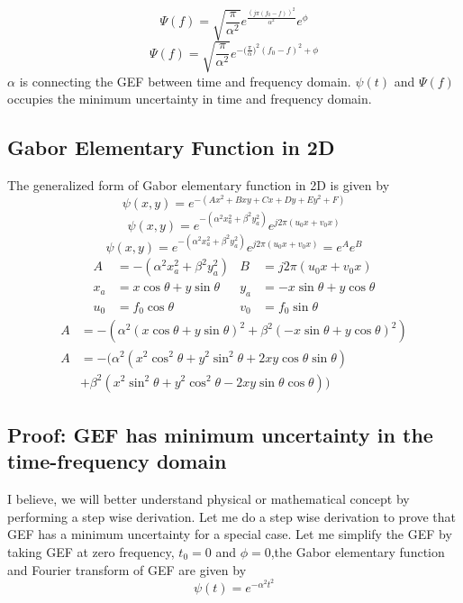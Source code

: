 \documentclass[paper=a4, fontsize=11pt,twoside]{scrartcl}		%
\begin{document}
\begin{equation*}
\Psi(f) = \sqrt{\frac{\pi}{\alpha ^2}} e^\frac{{(j\pi (f_0-f))}^2}{\alpha ^2}e^\phi
\end{equation*}
\begin{equation*}
\Psi(f) = \sqrt{\frac{\pi}{\alpha ^2}} e^{-{(\frac{\pi} {\alpha}})^2 ({f_0-f})^2+\phi}
\end{equation*}
$\alpha$ is connecting the GEF between time and frequency domain. $\psi(t)$ and $\Psi(f)$ occupies the minimum uncertainty in time and frequency domain.

\subsection {Gabor Elementary Function in 2D}
The generalized form of Gabor elementary function in 2D is given by
\begin{equation*}
\psi(x,y) = e^{-(Ax^2+Bxy+Cx+Dy+Ey^2+F)}
\end{equation*}
\begin{equation*}
\psi(x,y) = e^{-(\alpha ^2 x_a^2 + \beta ^2 y_a^2)}e^{j2\pi (u_0x+v_0x)}
\end{equation*}
\begin{equation*}
\psi(x,y) = e^{-(\alpha ^2 x_a^2 + \beta ^2 y_a^2)}e^{j2\pi (u_0x+v_0x)} = e^A e^B
\end{equation*}
\begin{align*}
A& = -(\alpha ^2 x_a^2 + \beta ^2 y_a^2) &
B& = j2\pi (u_0x+v_0x) \\
 x_a& = x \cos\theta+ y \sin\theta &
 y_a& = -x \sin\theta+ y \cos\theta\\
 u_0& = f_0 \cos\theta &
 v_0& = f_0 \sin\theta
\end{align*}
\begin{align*}
A& = -(\alpha ^2 (x \cos\theta+ y \sin\theta)^2 + \beta ^2 (-x \sin\theta+ y \cos\theta)^2) \\
A& = -(\alpha ^2 (x^2 \cos^2\theta+ y^2 \sin^2\theta+2xy \cos\theta \sin\theta) \\
& + \beta ^2 (x^2 \sin^2\theta+ y^2 \cos^2\theta -2xy \sin\theta \cos\theta))
\end{align*}


\subsection{Proof: GEF has minimum uncertainty in the time-frequency domain}

I believe, we will better understand physical or mathematical concept by performing a step wise derivation. Let me do a step wise derivation to prove that GEF has a minimum uncertainty for a special case. Let me simplify the GEF by taking GEF at zero frequency, $t_0 = 0$ and $\phi = 0$,the Gabor elementary function and Fourier transform of GEF are given by
\begin{equation*}
\psi(t) = e^{-\alpha ^2 t^2}
\end{equation*}
\end{document}
